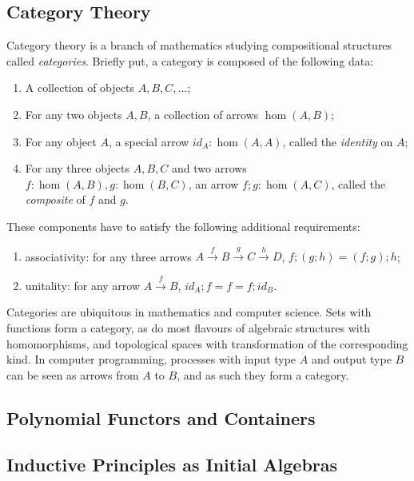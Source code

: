 \documentclass[a4paper]{article}
\begin{document}
\subsection{Category Theory}

Category theory is a branch of mathematics studying compositional structures called \textit{categories}. Briefly put, a category is composed of the following data:

\begin{enumerate}
	\item A collection of objects \(A, B, C, ...\);
	\item For any two objects \(A, B\), a collection of arrows \(\hom(A, B)\);
	\item For any object \(A\), a special arrow \(id_A : \hom(A, A)\), called the \textit{identity} on \(A\);
	\item For any three objects \(A, B, C\) and two arrows \(f : \hom(A, B), g : \hom(B, C)\), an arrow \(f ; g : \hom(A, C)\), called the \textit{composite} of \(f\) and \(g\).
\end{enumerate}

These components have to satisfy the following additional requirements:

\begin{enumerate}
	\item associativity: for any three arrows \(A \xrightarrow{f} B \xrightarrow{g} C \xrightarrow{h} D\), \(f ; (g ; h) = (f ; g) ; h\);
	\item unitality: for any arrow \(A \xrightarrow{f} B\), \(id_A ; f = f = f ; id_B\).
\end{enumerate}

Categories are ubiquitous in mathematics and computer science. Sets with functions form a category, as do most flavours of algebraic structures with homomorphisms, and topological spaces with transformation of the corresponding kind. In computer programming, processes with input type \(A\) and output type \(B\) can be seen as arrows from \(A\) to \(B\), and as such they form a category.

\subsection{Polynomial Functors and Containers}

\subsection{Inductive Principles as Initial Algebras}
\end{document}
